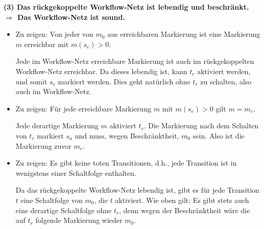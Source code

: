\pagebreak %

\textbf{(3) Das rückgekoppelte Workflow-Netz ist lebendig und beschränkt. $\Rightarrow$ Das Workflow-Netz ist sound.}

\begin{itemize}
	\item Zu zeigen: Von jeder von $m_0$ aus erreichbaren Markierung ist eine Markierung $m$ erreichbar mit $m(s_e) > 0$.
	
	Jede im Workflow-Netz erreichbare Markierung ist auch im rückgekoppelten Work\-flow-Netz erreichbar. Da dieses lebendig ist, kann $t_r$ aktiviert werden, und somit $s_e$ markiert werden. Dies geht natürlich ohne $t_r$ zu schalten, also auch im Workflow-Netz.
	
	\item Zu zeigen: Für jede erreichbare Markierung $m$ mit $m(s_e) > 0$ gilt $m = m_e$.
	
	Jede derartige Markierung $m$ aktiviert $t_r$. Die Markierung nach dem Schalten von $t_r$ markiert $s_a$ und muss, wegen Beschränktheit, $m_0$ sein. Also ist die Markierung zuvor $m_e$.
	
	\item Zu zeigen: Es gibt keine toten Transitionen, d.h., jede Transition ist in wenigstens einer Schaltfolge enthalten.
	
	Da das rückgekoppelte Workflow-Netz lebendig ist, gibt es für jede Transition $t$ eine Schaltfolge von $m_0$, die $t$ aktiviert. Wie oben gilt: Es gibt stets auch eine derartige Schaltfolge ohne $t_r$, denn wegen der Beschränktheit wäre die auf $t_r$ folgende Markierung wieder $m_0$.
\end{itemize}